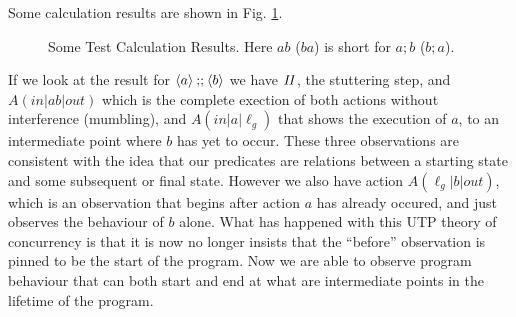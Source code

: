 Some calculation results are shown in Fig. \ref{fig:calc-results}.
\begin{figure}[t]
\caption{
  Some Test Calculation Results.
  Here $ab$ ($ba$) is short for $a;b$ ($b;a$).
}
\label{fig:calc-results}
\end{figure}
If we look at the result for $\langle a\rangle \mathbin{;\!;} \langle b\rangle$
we have $\mathit{II}$, the stuttering step,
and $A(in|ab|out)$ which is
the complete exection of both actions without interference (mumbling),
and $A(in|a|\ell_g)$ that shows the execution of $a$, to an intermediate
point where $b$ has yet to occur.
These three observations are consistent with the idea that
our predicates are relations between a starting state and some subsequent
or final state.
However we also have action $A(\ell_g|b|out)$,
which is an observation that begins after action $a$ has already occured,
and just observes the behaviour of $b$ alone.
What has happened with this UTP theory of concurrency
is that it is now no longer insists that the ``before'' observation
is pinned to be the start of the program. Now we are able to observe program
behaviour that can both start and end at what are intermediate points
in the lifetime of the program.

